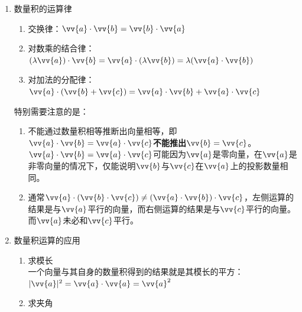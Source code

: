 \begin{enumerate}
    \begin{enumerate}
        \item 对功的计算进行数学抽象可以得到向量的\textbf{数量积}运算（也称点积、内积）。
        \item 对于非零向量$\vv{a}$与$\vv{b}$的数量积定义为$\vv{a}$的模长$\vv{b}$在$\vv{a}$方向上的投影数量的乘积，也可以等价定义为$\vv{a}$的模长，与$\vv{b}$的模长以及两者夹角的余弦值的乘积。
        \item 数量积运算的符号表达：$\vv{a} \cdot \vv{b} = |\vv{a}| |\vv{b}| cos<\vv{a}, \vv{b}>$
        \item 约定零向量与任意向量的数量积为0。
        \item 需要注意数量积运算不是线性运算。数量积运算的结果是一个\textbf{实数}。
    \end{enumerate}
    \item 数量积的运算律
    \begin{enumerate}
        \item 交换律：$\vv{a} \cdot \vv{b} = \vv{b} \cdot \vv{a}$
        \item 对数乘的结合律：$(\lambda \vv{a}) \cdot \vv{b} = \vv{a} \cdot (\lambda \vv{b}) = \lambda (\vv{a} \cdot \vv{b})$
        \item 对加法的分配律：$\vv{a} \cdot (\vv{b}+\vv{c}) = \vv{a} \cdot \vv{b} + \vv{a} \cdot \vv{c}$
    \end{enumerate}
    特别需要注意的是：
    \begin{enumerate}
        \item 不能通过数量积相等推断出向量相等，即$\vv{a} \cdot \vv{b} = \vv{a} \cdot \vv{c}$\textbf{不能推出}$\vv{b} = \vv{c}$。 \\
        $\vv{a} \cdot \vv{b} = \vv{a} \cdot \vv{c}$可能因为$\vv{a}$是零向量，在$\vv{a}$是非零向量的情况下，仅能说明$\vv{b}$与$\vv{c}$在$\vv{a}$上的投影数量相同。
        \item 通常$\vv{a} \cdot (\vv{b} \cdot \vv{c}) \neq (\vv{a} \cdot \vv{b}) \cdot \vv{c}$，左侧运算的结果是与$\vv{a}$平行的向量，而右侧运算的结果是与$\vv{c}$平行的向量。而$\vv{a}$未必和$\vv{c}$平行。
    \end{enumerate}
    \item 数量积运算的应用
        \begin{enumerate}
            \item 求模长 \\
            一个向量与其自身的数量积得到的结果就是其模长的平方：$|\vv{a}|^2 = \vv{a} \cdot \vv{a} = \vv{a}^2$
            \item 求夹角 \\

\end{enumerate}
\end{enumerate}
